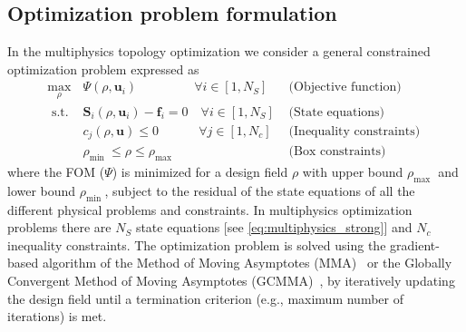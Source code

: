     \subsection*{Optimization problem formulation}
    In the multiphysics topology optimization we consider a general constrained optimization problem 
    expressed as
    \begin{equation}
        \begin{array}{clr}
            \max\limits_{\rho}                        & \Psi(\rho, \mathbf{u}_i) \quad \quad \quad \quad \,\,\, 
             \forall i \in\left[1, N_S\right] & \text { (Objective function) }                                                         \\
            \text { s.t. }                            & \mathbf{S}_i(\rho, \mathbf{u}_i)-\mathbf{f}_i=0 \quad
            \forall i \in\left[1, N_S\right]          & \text { (State equations) }                                                            \\
                                                      & c_j(\rho, \mathbf{u}) \leq 0 \quad \quad \quad \, \forall j \in\left[1,
            N_c\right]                                & \text { (Inequality constraints) }                                                     \\
                                                      & \rho_{\text {min }} \leq \rho \leq \rho_{\text {max }}                  & \text { (Box
                constraints) }
        \end{array}
    \end{equation}
    where the FOM ($\Psi$) is minimized for a design field $\rho$ with upper
    bound $\rho_{\text {max }}$ and lower bound $\rho_{\text {min }}$,
    subject to the residual of the state equations of all the different physical
    problems and constraints. In multiphysics optimization problems
    there are $N_S$ state equations [see \eqref{eq:multiphysics_strong}]
    and  $N_c$ inequality constraints. The optimization problem is solved using
    the gradient-based algorithm of the Method of Moving
    Asymptotes (MMA)~\cite{MMA} or the Globally Convergent Method of Moving Asymptotes
    (GCMMA)~\cite{GCMMA}, by iteratively updating the design field until a
    termination criterion (e.g., maximum number of iterations) is met.

